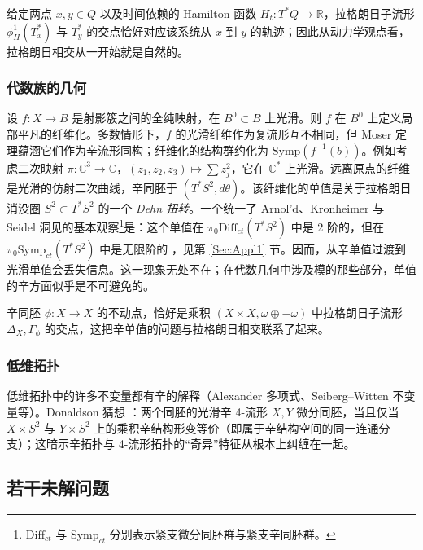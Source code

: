 \documentclass[11pt,a4paper]{article}
\numberwithin{equation}{section}
\newcommand{\bR}{\mathbb{R}}
\newcommand{\bC}{\mathbb{C}}
\newcommand{\Diff}{\mathrm{Diff}}
\newcommand{\Symp}{\mathrm{Symp}}
\begin{document}

给定两点 $x,y \in Q$ 以及时间依赖的 Hamilton 函数 $H_t: T^*Q \rightarrow \bR$，拉格朗日子流形 $\phi_H^1(T_x^*)$ 与 $T_y^*$ 的交点恰好对应该系统从 $x$ 到 $y$ 的轨迹；因此从动力学观点看，拉格朗日相交从一开始就是自然的。

\subsubsection{代数族的几何\label{Sec:AlgFamily}}

设 $f: X \rightarrow B$ 是射影簇之间的全纯映射，在 $B^0 \subset B$ 上光滑。则 $f$ 在 $B^0$ 上定义局部平凡的纤维化。多数情形下，$f$ 的光滑纤维作为复流形互不相同，但 Moser 定理蕴涵它们作为辛流形同构；纤维化的结构群约化为 $\Symp(f^{-1}(b))$。例如考虑二次映射 $\pi: \bC^3 \rightarrow \bC$，$(z_1,z_2,z_3) \mapsto \sum z_j^2$，它在 $\bC^*$ 上光滑。远离原点的纤维是光滑的仿射二次曲线，辛同胚于 $(T^*S^2, d\theta)$。该纤维化的单值是关于拉格朗日消没圈 $S^2 \subset T^*S^2$ 的一个 \emph{Dehn 扭转}。一个统一了 Arnol'd、Kronheimer 与 Seidel 洞见的基本观察\footnote{$\Diff_{ct}$ 与 $\Symp_{ct}$ 分别表示紧支微分同胚群与紧支辛同胚群。}是：这个单值在 $\pi_0 \Diff_{ct}(T^*S^2)$ 中是 2 阶的，但在 $\pi_0 \Symp_{ct}(T^*S^2)$ 中是无限阶的 \cite{Seidel:twist}，见第 \ref{Sec:Appl1} 节。因而，从辛单值过渡到光滑单值会丢失信息。这一现象无处不在；在代数几何中涉及模的那些部分，单值的辛方面似乎是不可避免的。

辛同胚 $\phi: X \rightarrow X$ 的不动点，恰好是乘积 $(X\times X, \omega \oplus -\omega)$ 中拉格朗日子流形 $\Delta_X, \Gamma_{\phi}$ 的交点，这把辛单值的问题与拉格朗日相交联系了起来。

\subsubsection{低维拓扑}

低维拓扑中的许多不变量都有辛的解释（Alexander 多项式、Seiberg--Witten 不变量等）。Donaldson 猜想 \cite[p.437]{McD-S}：两个同胚的光滑辛 4-流形 $X,Y$ 微分同胚，当且仅当 $X\times S^2$ 与 $Y\times S^2$ 上的乘积辛结构形变等价（即属于辛结构空间的同一连通分支）；这暗示辛拓扑与 4-流形拓扑的“奇异”特征从根本上纠缠在一起。

\subsection{若干未解问题}
\end{document}
